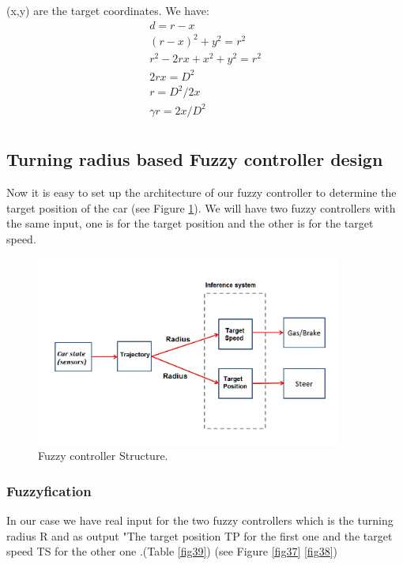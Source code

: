 \documentclass{llncs}
\begin{document}
(x,y) are the target coordinates. We have:\\
\begin{gather}
d = r - x\\
(r - x)^2 + y^2 = r^2  \\
r^2 - 2rx + x^2 + y^2 = r^2\\	
2rx = D^2\\	
r = D^2/2x\\
\gamma r = 2x/D^2\\
\end{gather}	

\subsection{Turning radius based Fuzzy controller design}
Now it is easy to set up the architecture of our fuzzy controller to determine the target position of the car (see Figure \ref {fig36}). We will have two fuzzy controllers with the same input, one is for the target position and the other is for the target speed. 
\begin{figure}[h!]
	
	\centering
	\includegraphics[width=0.9\textwidth]{fig/rayon21.PNG}
	\begin{minipage}{10cm}
		\centering
		\caption{\footnotesize Fuzzy controller Structure.}
		\label{fig36}
	\end{minipage} 
	
\end{figure}

\subsubsection{Fuzzyfication}

In our case we have real input for the two fuzzy controllers which is the turning radius R and as output "The target position TP  for the first one and the target speed TS  for the other one .(Table \ref{fig39}) (see Figure \ref{fig37} \ref{fig38})
\end{document}
